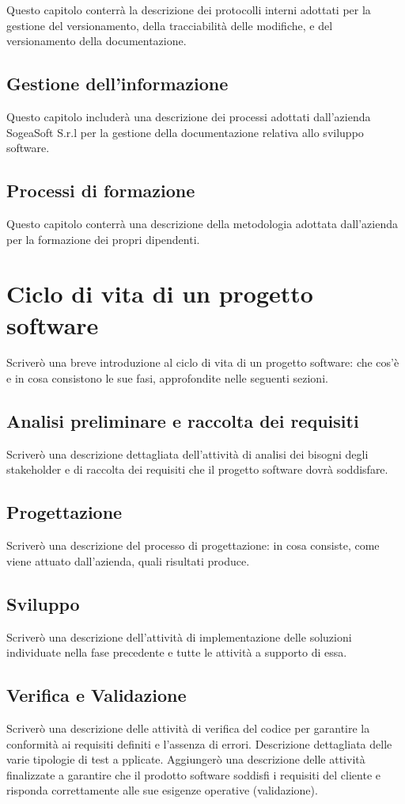         Questo capitolo conterrà la descrizione dei protocolli interni adottati per la gestione del
        versionamento, della tracciabilità delle modifiche, e del versionamento della documentazione.
        \subsection{Gestione dell’informazione}
        Questo capitolo includerà una descrizione dei processi adottati dall’azienda SogeaSoft S.r.l
        per la gestione della documentazione relativa allo sviluppo software.
        \subsection{Processi di formazione}
        Questo capitolo conterrà una descrizione della metodologia adottata dall’azienda per la formazione dei propri dipendenti.
    \section{Ciclo di vita di un progetto software}
    Scriverò una breve introduzione al ciclo di vita di un progetto software: che cos’è e in cosa
    consistono le sue fasi, approfondite nelle seguenti sezioni.
        \subsection{Analisi preliminare e raccolta dei requisiti}
        Scriverò una descrizione dettagliata dell’attività di analisi dei bisogni degli stakeholder e di
        raccolta dei requisiti che il progetto software dovrà soddisfare.
        \subsection{Progettazione}
        Scriverò una descrizione del processo di progettazione: in cosa consiste, come viene attuato
        dall’azienda, quali risultati produce.
        \subsection{Sviluppo}
        Scriverò una descrizione dell’attività di implementazione delle soluzioni individuate nella
        fase precedente e tutte le attività a supporto di essa.
        \subsection{Verifica e Validazione}
        Scriverò una descrizione delle attività di verifica del codice per garantire la conformità ai
        requisiti definiti e l'assenza di errori. Descrizione dettagliata delle varie tipologie di test a       pplicate.
        Aggiungerò una descrizione delle attività finalizzate a garantire che il prodotto software
        soddisfi i requisiti del cliente e risponda correttamente alle sue      esigenze operative
        (validazione).
